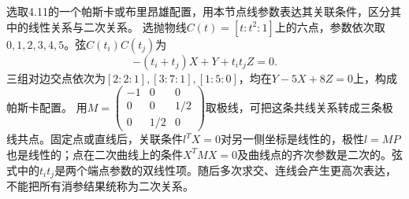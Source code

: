 选取4.11的一个帕斯卡或布里昂雄配置，用本节点线参数表达其关联条件，区分其中的线性关系与二次关系。
\solutionanswer
选抛物线\(C(t)=[t:t^2:1]\)上的六点，参数依次取\(0,1,2,3,4,5\)。弦\(C(t_i)C(t_j)\)为
\[
 -(t_i+t_j)X+Y+t_it_jZ=0.
\]
三组对边交点依次为\([2:2:1],[3:7:1],[1:5:0]\)，均在\(Y-5X+8Z=0\)上，构成帕斯卡配置。
用\(M=\left(\begin{smallmatrix}-1&0&0\\0&0&1/2\\0&1/2&0\end{smallmatrix}\right)\)取极线，可把这条共线关系转成三条极线共点。固定点或直线后，关联条件\(l^TX=0\)对另一侧坐标是线性的，极性\(l=MP\)也是线性的；点在二次曲线上的条件\(X^TMX=0\)及曲线点的齐次参数是二次的。弦式中的\(t_it_j\)是两个端点参数的双线性项。随后多次求交、连线会产生更高次表达，不能把所有消参结果统称为二次关系。
\par
